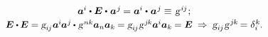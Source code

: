 \begin{otherlanguage}{russian}
\begin{equation}
\begin{array}{c}
\bm{a}^{\hspace{-0.05ex}i} \dotp \UnitDyad \dotp \hspace{.1ex} \bm{a}^{\hspace{.1ex}j} \hspace{-0.15ex} = \bm{a}^{\hspace{-0.05ex}i} \dotp \hspace{.1ex} \bm{a}^{\hspace{.1ex}j} \hspace{-0.15ex} \hspace{.1ex} \equiv \hspace{.16ex} \textsl{g}^{\hspace{0.2ex}i\hspace{-0.1ex}j} \hspace{.1ex} ;
\\[0.2em]
%
\scalebox{.96}{$\UnitDyad \dotp \hspace{-0.1ex} \UnitDyad = \textsl{g}_{i\hspace{-0.1ex}j} \hspace{.1ex} \bm{a}^{\hspace{-0.05ex}i} \hspace{-0.1ex} \bm{a}^{\hspace{0.05ex}j} \hspace{-0.1ex} \dotp \hspace{.1ex} \textsl{g}^{\hspace{0.2ex}nk} \bm{a}_n \bm{a}_k \hspace{-0.1ex} = \textsl{g}_{i\hspace{-0.1ex}j} \hspace{.1ex} \textsl{g}^{\hspace{0.2ex}j\hspace{-0.1ex}k} \bm{a}^{\hspace{-0.05ex}i} \bm{a}_k \hspace{-0.1ex} = \UnitDyad$}
\:\Rightarrow\: \textsl{g}_{i\hspace{-0.1ex}j} \hspace{.1ex} \textsl{g}^{\hspace{.2ex}j\hspace{-0.1ex}k} \hspace{-0.25ex} = \delta_i^{\hspace{0.05ex}k} \hspace{-0.1ex}.
\end{array}\end{equation}


\end{otherlanguage}
